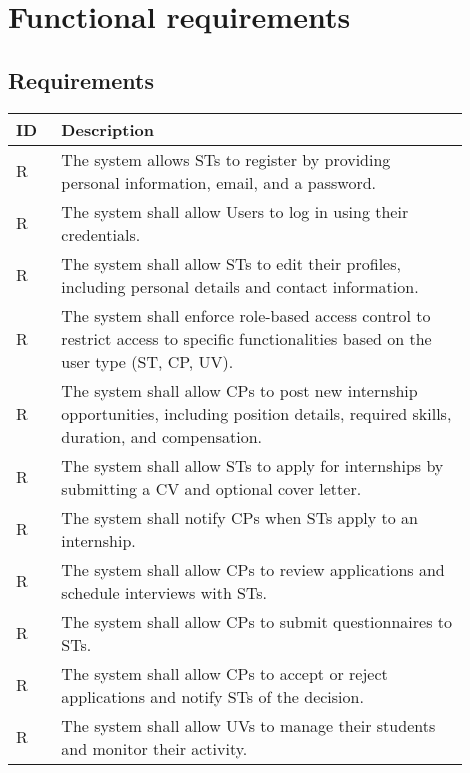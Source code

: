 \section{Functional requirements}
\label{sec:functional_requirements}%

\subsection{Requirements}
\label{subsec:requirements3}%
\setcounter{req}{1}
\newcommand{\creq}{\thereq\stepcounter{req}}
\begin{center}
    \begin{longtable}{|l|p{0.9\linewidth}|}
        \hline
        \textbf{ID} & \textbf{Description}\\
        \hline
        R\creq & {The system allows STs to register by providing personal information, email, and a password.}\\
        \hline
        R\creq & {The system shall allow Users to log in using their credentials.}\\
        \hline
        R\creq & {The system shall allow STs to edit their profiles, including personal details and contact information.}\\
        \hline
        R\creq & {The system shall enforce role-based access control to restrict access to specific functionalities based on the user type (ST, CP, UV).}\\
        \hline
        R\creq & {The system shall allow CPs to post new internship opportunities, including position details, required skills, duration, and compensation.}\\
        \hline
        R\creq & {The system shall allow STs to apply for internships by submitting a CV and optional cover letter.}\\
        \hline
        R\creq & {The system shall notify CPs when STs apply to an internship.}\\
        \hline
        R\creq & {The system shall allow CPs to review applications and schedule interviews with STs.}\\
        \hline
        R\creq & {The system shall allow CPs to submit questionnaires to STs.}\\
        \hline
        R\creq & {The system shall allow CPs to accept or reject applications and notify STs of the decision.}\\
        \hline
        R\creq & {The system shall allow UVs to manage their students and monitor their activity.}\\

\end{longtable}
\end{center}
